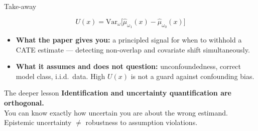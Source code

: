 \documentclass[aspectratio=169]{beamer}
\begin{document}
\begin{frame}{Take-away}

\[
U(x) = \mathrm{Var}_\omega\bigl[\hat\mu_{\omega_1}(x) - \hat\mu_{\omega_0}(x)\bigr]
\]

\begin{itemize}
  \item \textbf{What the paper gives you:}
        a principled signal for when to withhold a CATE estimate ---
        detecting non-overlap and covariate shift simultaneously.

  \item \textbf{What it assumes and does not question:}
        unconfoundedness, correct model class, i.i.d.\ data.
        High $U(x)$ is not a guard against confounding bias.
\end{itemize}

\bigskip
\begin{block}{The deeper lesson}
\textbf{Identification and uncertainty quantification are orthogonal.}\\
You can know exactly how uncertain you are about the wrong estimand.\\
Epistemic uncertainty $\neq$ robustness to assumption violations.
\end{block}
\end{frame}
\end{document}

